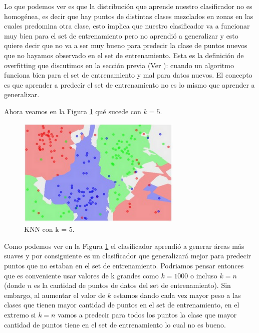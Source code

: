 \documentclass[12pt,a4paper]{article}
\begin{document}
\begin{sloppypar}
Lo que podemos ver es que la distribución que aprende nuestro clasificador no es homogénea, es decir que hay puntos de distintas clases mezclados en zonas en las cuales predomina otra clase, esto implica que nuestro clasificador va a funcionar muy bien para el set de entrenamiento pero no aprendió a generalizar y esto quiere decir que no va a ser muy bueno para predecir la clase de puntos nuevos que no hayamos observado en el set de entrenamiento. Esta es la definición de overfitting que discutimos en la sección previa (Ver \textit{}): cuando un algoritmo funciona bien para el set de entrenamiento y mal para datos nuevos. El concepto es que aprender a predecir el set de entrenamiento no es lo mismo que aprender a generalizar.

\cleardoublepage
Ahora veamos en la Figura \ref{fig:KNN_k_5} qué sucede con $k = 5$.

\begin{figure}[H]    %
 \centering
 \includegraphics[width=0.7\textwidth]{images/KNN_k_5.png}
 \captionsetup{justification=centering,margin=2cm}
 \caption{KNN con k = 5. \cite{apunte_uba}} 
 \label{fig:KNN_k_5}
\end{figure}

Como podemos ver en la Figura \ref{fig:KNN_k_5} el clasificador aprendió a generar áreas más suaves y por consiguiente es un clasificador que generalizará mejor para predecir puntos que no estaban en el set de entrenamiento. Podriamos pensar entonces que es conveniente usar valores de k grandes como $k = 1000$ o incluso $k = n$ (donde $n$ es la cantidad de puntos de datos del set de entrenamiento). Sin embargo, al aumentar el valor de $k$ estamos dando cada vez mayor peso a las clases que tienen mayor cantidad de puntos en el set de entrenamiento, en el extremo si $k = n$ vamos a predecir para todos los puntos la clase que mayor cantidad de puntos tiene en el set de entrenamiento lo cual no es bueno. 


\end{sloppypar}
\end{document}
